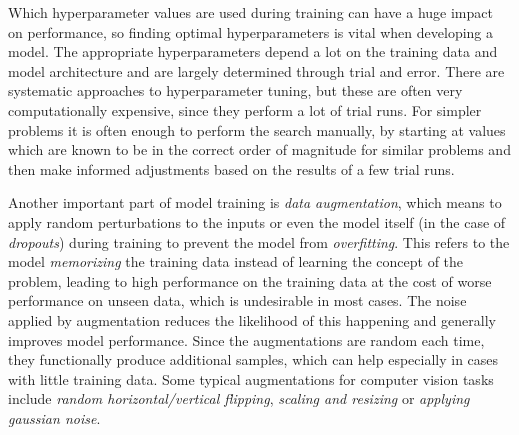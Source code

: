 Which hyperparameter values are used during training can have a huge impact on performance, so finding optimal hyperparameters is vital when developing a model. 
The appropriate hyperparameters depend a lot on the training data and model architecture and are largely determined through trial and error. 
There are systematic approaches to hyperparameter tuning, but these are often very computationally expensive, since they perform a lot of trial runs. 
For simpler problems it is often enough to perform the search manually, by starting at values which are known to be in the correct order of magnitude for similar problems and then make informed adjustments based on the results of a few trial runs. 

Another important part of model training is \emph{data augmentation}, which means to apply random perturbations to the inputs or even the model itself (in the case of \emph{dropouts}) during training to prevent the model from \emph{overfitting}. 
This refers to the model \emph{memorizing} the training data instead of learning the concept of the problem, leading to high performance on the training data at the cost of worse performance on unseen data, which is undesirable in most cases. 
The noise applied by augmentation reduces the likelihood of this happening and generally improves model performance. 
Since the augmentations are random each time, they functionally produce additional samples, which can help especially in cases with little training data. 
Some typical augmentations for computer vision tasks include \emph{random horizontal/vertical flipping}, \emph{scaling and resizing} or \emph{applying gaussian noise}. 